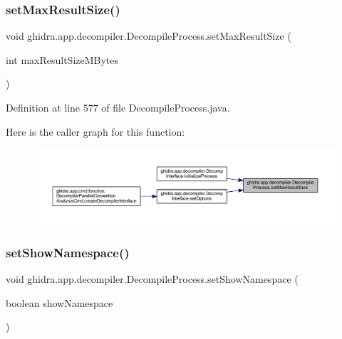 \subsubsection{\texorpdfstring{setMaxResultSize()}{setMaxResultSize()}}
{\footnotesize\ttfamily void ghidra.\+app.\+decompiler.\+Decompile\+Process.\+set\+Max\+Result\+Size (\begin{DoxyParamCaption}\item[{int}]{max\+Result\+Size\+M\+Bytes }\end{DoxyParamCaption})\hspace{0.3cm}{\ttfamily [inline]}}



Definition at line 577 of file Decompile\+Process.\+java.

Here is the caller graph for this function\+:
\nopagebreak
\begin{figure}[H]
\begin{center}
\leavevmode
\includegraphics[width=350pt]{classghidra_1_1app_1_1decompiler_1_1_decompile_process_a789f75a2a43bd5a85a88442c9cc1710d_icgraph}
\end{center}
\end{figure}
\mbox{\label{classghidra_1_1app_1_1decompiler_1_1_decompile_process_a86fcccae24b54cd29f7936b7aae7ece8}} 
\subsubsection{\texorpdfstring{setShowNamespace()}{setShowNamespace()}}
{\footnotesize\ttfamily void ghidra.\+app.\+decompiler.\+Decompile\+Process.\+set\+Show\+Namespace (\begin{DoxyParamCaption}\item[{boolean}]{show\+Namespace }\end{DoxyParamCaption})\hspace{0.3cm}{\ttfamily [inline]}}




